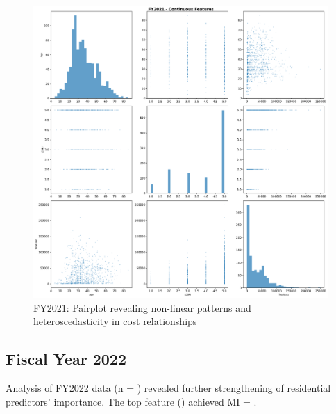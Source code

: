 \newpage

\vspace*{\fill}
\begin{figure}[htbp]
\centering
\includegraphics[width=\textwidth]{fy2021_pairplot_top_features.png}
\caption{FY2021: Pairplot revealing non-linear patterns and heteroscedasticity in cost relationships}
\end{figure}
\vspace*{\fill}

\newpage

\subsection{Fiscal Year 2022}

Analysis of FY2022 data (n = \FSRecordsFinalFYTwoThousandTwentyTwo) revealed further strengthening of residential predictors' importance. The top feature (\FSTopFeatureFYTwoThousandTwentyTwo) achieved MI = \FSTopMIFYTwoThousandTwentyTwo.

